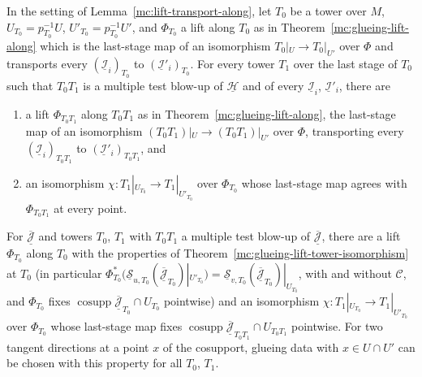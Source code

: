 \begin{theorem}
\label{mc:glueing-lift-tail}
\leanok
In the setting of Lemma~\ref{mc:lift-transport-along}, let \(T_0\) be a tower over \(M\), \(U_{T_0}=p_{T_0}^{-1}U\), \(U'_{T_0}=p_{T_0}^{-1}U'\), and \(\Phi_{T_0}\) a lift along
\(T_0\) as in Theorem~\ref{mc:glueing-lift-along} which is the last-stage map of an isomorphism \(T_0|_U\to T_0|_{U'}\) over \(\Phi\) and transports every
\((\underline{\mathcal I}_i)_{T_0}\) to \((\underline{\mathcal I}'_i)_{T_0}\). For every tower \(T_1\) over the last stage of \(T_0\) such that \(T_0T_1\) is a multiple test blow-up of
\(\underline{\mathcal H}\) and of every \(\underline{\mathcal I}_i\), \(\underline{\mathcal I}'_i\), there are
\begin{enumerate}
\item a lift \(\Phi_{T_0T_1}\) along \(T_0T_1\) as in Theorem~\ref{mc:glueing-lift-along}, the last-stage map of an isomorphism \((T_0T_1)|_U\to(T_0T_1)|_{U'}\) over \(\Phi\),
transporting every \((\underline{\mathcal I}_i)_{T_0T_1}\) to \((\underline{\mathcal I}'_i)_{T_0T_1}\), and
\item an isomorphism \(\chi\colon T_1|_{U_{T_0}}\to T_1|_{U'_{T_0}}\) over \(\Phi_{T_0}\) whose last-stage map agrees with \(\Phi_{T_0T_1}\) at every point.
\end{enumerate}
For \(\overline{\underline{\mathcal J}}\) and towers \(T_0\), \(T_1\) with \(T_0T_1\) a multiple test blow-up of \(\overline{\underline{\mathcal J}}\), there are a lift \(\Phi_{T_0}\) along \(T_0\)
with the properties of Theorem~\ref{mc:glueing-lift-tower-isomorphism} at \(T_0\) (in particular
\(\Phi_{T_0}^*(\underline{\mathcal S}_{u,T_0}(\overline{\underline{\mathcal J}}_{T_0})|_{U'_{T_0}})=\underline{\mathcal S}_{v,T_0}(\overline{\underline{\mathcal J}}_{T_0})|_{U_{T_0}}\), with and
without \(\mathcal C\), and \(\Phi_{T_0}\) fixes \(\operatorname{cosupp}\overline{\underline{\mathcal J}}_{T_0}\cap U_{T_0}\) pointwise) and an isomorphism
\(\chi\colon T_1|_{U_{T_0}}\to T_1|_{U'_{T_0}}\) over \(\Phi_{T_0}\) whose last-stage map fixes \(\operatorname{cosupp}\overline{\underline{\mathcal J}}_{T_0T_1}\cap U_{T_0T_1}\) pointwise.
For two tangent directions at a point \(x\) of the cosupport, glueing data with \(x\in U\cap U'\) can be chosen with this property for all \(T_0\), \(T_1\).
\end{theorem}
